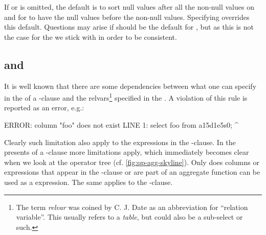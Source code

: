 If  or  is omitted, the
default is to sort null values after all the non-null values on
 and for  to have
the null values before the non-null values.  Specifying
 overrides this default.  Questions
may arise if  should be the default for
, but as this is not the case for the
 we stick with  in order to
be consistent.


\subsection{ and }
It is well known that there are some dependencies between what one can
specify in the  of a -clause and
the relvars\footnote{The term \emph{relvar} was coined by C. J. Date
as an abbreviation for ``relation variable''.  This usually refers to
a \emph{table}, but could also be a sub-select or such.} specified
in the .  A violation of this rule is reported as an
error, e.g.:

\begin{interactive}
ERROR:  column "foo" does not exist
LINE 1: select foo from a15d1e5s0;
               ^
\end{interactive}

\noindent
Clearly such limitation also apply to the expressions in the
-clause.  In the presents of a
-clause more limitations apply, which immediately
becomes clear when we look at the operator tree
(cf. \autoref{fig:qp-agg-skyline}).  Only does columns or expressions
that appear in the -clause or are part of an
aggregate function can be used as a  expression.
The same applies to the -clause.


